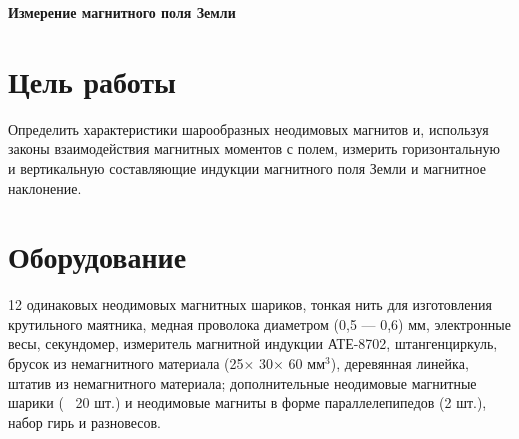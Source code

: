 \documentclass[a4paper, fontsize=14pt]{article}
\begin{document}


\huge
\centering
\textbf{Измерение магнитного поля Земли}

\raggedright
\parindent=1cm
\large
	\section*{Цель работы}
	Определить характеристики шарообразных неодимовых магнитов и, используя законы взаимодействия магнитных моментов с полем, измерить горизонтальную и вертикальную составляющие индукции магнитного поля Земли и магнитное наклонение.
	\section*{Оборудование}
	12 одинаковых неодимовых магнитных шариков, тонкая нить для изготовления крутильного маятника, медная проволока диаметром (0,5 --- 0,6) мм, электронные весы, секундомер, измеритель магнитной индукции АТЕ-8702, штангенциркуль, брусок из немагнитного материала  (25$\times$ 30$\times$ 60  $\text{мм}^3$), деревянная  линейка, штатив из  немагнитного  материала; дополнительные неодимовые магнитные шарики (~ 20 шт.) и неодимовые магниты в форме параллелепипедов (2 шт.), набор гирь и разновесов.
\end{document}
